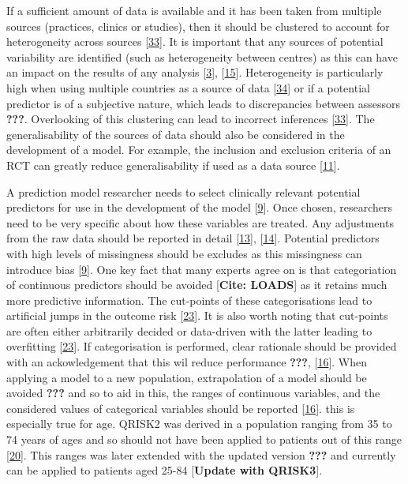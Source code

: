 \documentclass[
]{article}
\begin{document}
If a sufficient amount of data is available and it has been taken from multiple sources (practices, clinics or studies), then it should be clustered to account for heterogeneity across sources {[}\protect\hyperlink{ref-liquet_investigating_2012}{33}{]}. It is important that any sources of potential variability are identified (such as heterogeneity between centres) as this can have an impact on the results of any analysis {[}\protect\hyperlink{ref-hemingway_prognosis_2013}{3}{]}, {[}\protect\hyperlink{ref-riley_external_2016}{15}{]}. Heterogeneity is particularly high when using multiple countries as a source of data {[}\protect\hyperlink{ref-snell_multivariate_2016}{34}{]} or if a potential predictor is of a subjective nature, which leads to discrepancies between assessors {\textbf{???}}. Overlooking of this clustering can lead to incorrect inferences {[}\protect\hyperlink{ref-liquet_investigating_2012}{33}{]}. The generalisability of the sources of data should also be considered in the development of a model. For example, the inclusion and exclusion criteria of an RCT can greatly reduce generalisability if used as a data source {[}\protect\hyperlink{ref-moons_prognosis_2009}{11}{]}.

A prediction model researcher needs to select clinically relevant potential predictors for use in the development of the model {[}\protect\hyperlink{ref-royston_prognosis_2009}{9}{]}. Once chosen, researchers need to be very specific about how these variables are treated. Any adjustments from the raw data should be reported in detail {[}\protect\hyperlink{ref-collins_transparent_2015}{13}{]}, {[}\protect\hyperlink{ref-moons_transparent_2015}{14}{]}. Potential predictors with high levels of missingness should be excludes as this missingness can introduce bias {[}\protect\hyperlink{ref-royston_prognosis_2009}{9}{]}. One key fact that many experts agree on is that categoriation of continuous predictors should be avoided {[}\textbf{Cite: LOADS}{]} as it retains much more predictive information. The cut-points of these categorisations lead to artificial jumps in the outcome risk {[}\protect\hyperlink{ref-sauerbrei_selection_2007}{23}{]}. It is also worth noting that cut-points are often either arbitrarily decided or data-driven with the latter leading to overfitting {[}\protect\hyperlink{ref-sauerbrei_selection_2007}{23}{]}. If categorisation is performed, clear rationale should be provided with an ackowledgement that this wil reduce performance {\textbf{???}}, {[}\protect\hyperlink{ref-collins_systematic_2013}{16}{]}. When applying a model to a new population, extrapolation of a model should be avoided {\textbf{???}} and so to aid in this, the ranges of continuous variables, and the considered values of categorical variables should be reported {[}\protect\hyperlink{ref-collins_systematic_2013}{16}{]}. this is especially true for age. QRISK2 was derived in a population ranging from 35 to 74 years of ages and so should not have been applied to patients out of this range {[}\protect\hyperlink{ref-hippisley-cox_predicting_2008}{20}{]}. This ranges was later extended with the updated version {\textbf{???}} and currently can be applied to patients aged 25-84 {[}\textbf{Update with QRISK3}{]}.
\end{document}
